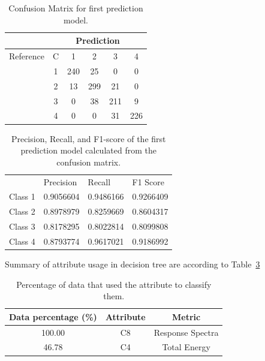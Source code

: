 \begin{table}
\centering
\caption{Confusion Matrix for first prediction model.}
\begin{tabular}{cccccc}
\hline
                           & \multicolumn{5}{c}{Prediction} \\ \hline
{Reference} & C  & 1    & 2    & 3    & 4    \\
                           & 1     & 240  & 25   & 0    & 0    \\
                           & 2     & 13   & 299  & 21   & 0    \\
                           & 3     & 0    & 38   & 211  & 9   \\
                           & 4     & 0    & 0    & 31  & 226  \\ \hline
\end{tabular}
\label{tab:confusionmat_test_1}
\end{table}


\begin{table}
\centering
\caption{Precision, Recall, and F1-score of the first prediction model calculated from the confusion matrix.}
\begin{tabular}{llll}
\hline
        & Precision & Recall  & F1 Score \\ \cline{2-4} 
Class 1 & 0.9056604 & 0.9486166 & 0.9266409 \\
Class 2 & 0.8978979 & 0.8259669 & 0.8604317 \\
Class 3 & 0.8178295 & 0.8022814 & 0.8099808 \\
Class 4 & 0.8793774 & 0.9617021 & 0.9186992 \\ \hline
\end{tabular}
\label{tab:prec_recall_test_1}
\end{table}


Summary of attribute usage in decision tree are according to Table~\ref{tab:attribute_usage_1}

\begin{table}
\centering
\caption{Percentage of data that used the attribute to classify them.}
\begin{tabular}{ccc}
\hline
Data percentage (\%) & Attribute & Metric                \\ \hline
100.00               & C8        & Response Spectra      \\
46.78                 & C4        & Total Energy         \\ \hline
\end{tabular}
\label{tab:attribute_usage_1}
\end{table}

